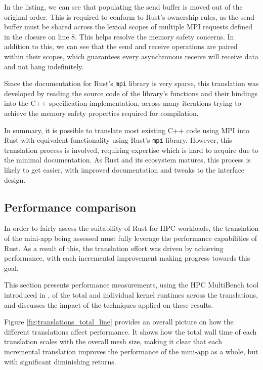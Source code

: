 In the listing, we can see that populating the send buffer is moved out of the original order. This is required to conform to Rust's ownership rules, as the send buffer must be shared across the lexical scopes of multiple MPI requests defined in the closure on line 8. This helps resolve the memory safety concerns. In addition to this, we can see that the send and receive operations are paired within their scopes, which guarantees every asynchronous receive will receive data and not hang indefinitely.

Since the documentation for Rust's \texttt{mpi} library is very sparse, this translation was developed by reading the source code of the library's functions and their bindings into the C++ specification implementation, across many iterations trying to achieve the memory safety properties required for compilation.

In summary, it is possible to translate most existing C++ code using MPI into Rust with equivalent functionality using Rust's \texttt{mpi} library. However, this translation process is involved, requiring expertise which is hard to acquire due to the minimal documentation. As Rust and its ecosystem matures, this process is likely to get easier, with improved documentation and tweaks to the interface design.

\subsection{Performance comparison}
\label{sec:translation-performance}

In order to fairly assess the suitability of Rust for \acrshort{HPC} workloads, the translation of the \acrshort{mini-app} being assessed must fully leverage the performance capabilities of Rust. As a result of this, the translation effort was driven by achieving performance, with each incremental improvement making progress towards this goal.

This section presents performance measurements, using the HPC MultiBench tool introduced in , of the total and individual kernel runtimes across the translations, and discusses the impact of the techniques applied on these results.

Figure \ref{fig:translations_total_line} provides an overall picture on how the different translations affect performance. It shows how the total wall time of each translation scales with the overall mesh size, making it clear that each incremental translation improves the performance of the \acrshort{mini-app} as a whole, but with significant diminishing returns.

